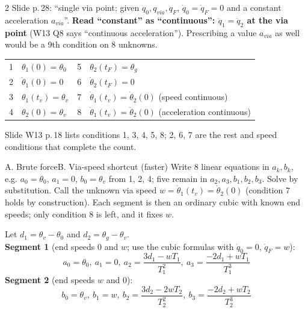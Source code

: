 \begin{multicols}{2}
\nopagebreak[4]
Slide p.\,28: ``single via point; given $q_0,q_{via},q_F$, $\dot q_0=\dot q_F=0$ and a constant acceleration $a_{via}$''. \textbf{Read ``constant'' as ``continuous'': $\ddot q_1=\ddot q_2$ at the via point} (W13 Q8 says ``continuous acceleration''). Prescribing a value $a_{via}$ as well would be a 9th condition on 8 unknowns.
\begin{fbx}
\par\begin{tabularx}{\linewidth}{@{}rlrl@{}}
1&$\theta_1(0)=\theta_0$&5&$\theta_2(t_F)=\theta_g$\\
2&$\dot\theta_1(0)=0$&6&$\dot\theta_2(t_F)=0$\\
3&$\theta_1(t_v)=\theta_v$&7&$\dot\theta_1(t_v)=\dot\theta_2(0)$ (speed continuous)\\
4&$\theta_2(0)=\theta_v$&8&$\ddot\theta_1(t_v)=\ddot\theta_2(0)$ (acceleration continuous)\\
\end{tabularx}
Slide W13 p.\,18 lists conditions 1, 3, 4, 5, 8; 2, 6, 7 are the rest and speed conditions that complete the count.
\end{fbx}
\begin{twoway}{A. Brute force}{B. Via-speed shortcut (faster)}
Write 8 linear equations in $a_k,b_k$, e.g. $a_0=\theta_0$, $a_1=0$, $b_0=\theta_v$ from 1, 2, 4; five remain in $a_2,a_3,b_1,b_2,b_3$. Solve by substitution.
\tcblower
Call the unknown via speed $w=\dot\theta_1(t_v)=\dot\theta_2(0)$ (condition 7 holds by construction). Each segment is then an ordinary cubic with known end speeds; only condition 8 is left, and it fixes $w$.
\end{twoway}
\begin{deriv}[of the via speed $w$ and the coefficients, durations $T_1=t_v$, $T_2=t_F$]
Let $d_1=\theta_v-\theta_0$ and $d_2=\theta_g-\theta_v$.\\
\textbf{Segment 1} (end speeds $0$ and $w$; use the cubic formulas with $\dot q_0=0$, $\dot q_F=w$):
\[a_0=\theta_0,\ a_1=0,\ a_2=\frac{3d_1-wT_1}{T_1^2},\ a_3=\frac{-2d_1+wT_1}{T_1^3}\]
\textbf{Segment 2} (end speeds $w$ and $0$):
\[b_0=\theta_v,\ b_1=w,\ b_2=\frac{3d_2-2wT_2}{T_2^2},\ b_3=\frac{-2d_2+wT_2}{T_2^3}\]

\end{deriv}
\end{multicols}
